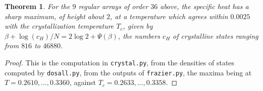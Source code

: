 \documentclass[11pt,a4paper]{article}
\newtheorem{thm}{Theorem}[section]
\theoremstyle{remark}
\begin{document}
\begin{samepage}
\begin{thm}\label{thm:order36}
For the $9$ regular arrays of order $36$ above, the specific heat has a sharp maximum, of height about $2$, at a temperature which agrees within $0.0025$ with the crystallization temperature $T_c$, given by $\beta+\log(c_H)/N=2\log2+\Psi(\beta)$, the numbers $c_H$ of crystalline states ranging from $816$ to $46880$.
\end{thm}
\end{samepage}

\begin{proof}
This is the computation in \texttt{crystal.py}, from the densities of states computed by \texttt{dosall.py}, from the outputs of \texttt{frazier.py}, the maxima being at $T=0.2610,\ldots,0.3360$, against $T_c=0.2633,\ldots,0.3358$.
\end{proof}
\end{document}
